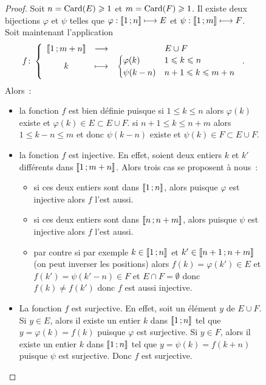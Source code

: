 \begin{figure}
\begin{proof}
  Soit \(n=\operatorname{Card}(E)\geqslant 1\) et \(m=\operatorname{Card}(F)\geqslant 1\). Il existe deux bijections \(\varphi\) et \(\psi\) telles que \(\varphi:\mathopen{\llbracket}1\mathclose{}\mathpunct{};n\mathclose{\rrbracket} \longmapsto E\) et \(\psi:\mathopen{\llbracket}1\mathclose{}\mathpunct{};m\mathclose{\rrbracket} \longmapsto F\). Soit maintenant l'application
  \begin{equation}
    f\colon \left\{\begin{array}{ccc} \mathopen{\llbracket}1\mathclose{}\mathpunct{};m+n\mathclose{\rrbracket} & \longrightarrow &E\cup F\\ k & \longmapsto & \begin{cases} \varphi(k) & 1\leqslant k\leqslant n \\ \psi(k-n) & n+1\leqslant k\leqslant m+n\end{cases} \end{array} \right..
  \end{equation}
  Alors~:
    \begin{itemize}
    \item la fonction \(f\) est bien définie puisque si \(1\leqslant k \leqslant n\) alors \(\varphi(k)\) existe et \(\varphi(k)\in E\subset E\cup F\). si \(n+1\leqslant k \leqslant n+m\) alors \(1\leqslant k-n \leqslant m\) et donc \(\psi(k-n)\) existe et \(\psi(k)\in F\subset E\cup F\).
    \item la fonction \(f\) est injective. En effet, soient deux entiers \(k\) et \(k'\) différents  dans \(\mathopen{\llbracket}1\mathclose{}\mathpunct{};m+n\mathclose{\rrbracket}\). Alors trois cas se proposent à nous~:
      \begin{itemize}
      \item si ces deux entiers sont dans \(\mathopen{\llbracket}1\mathclose{}\mathpunct{};n\mathclose{\rrbracket}\), alors puisque \(\varphi\) est injective alors \(f\) l'est aussi.
      \item si ces deux entiers sont dans \(\mathopen{\llbracket}n\mathclose{}\mathpunct{};n+m\mathclose{\rrbracket}\), alors puisque \(\psi\) est injective alors \(f\) l'est aussi.
      \item par contre si par exemple \(k\in\mathopen{\llbracket}1\mathclose{}\mathpunct{};n\mathclose{\rrbracket}\) et \(k'\in\mathopen{\llbracket}n+1\mathclose{}\mathpunct{};n+m\mathclose{\rrbracket}\) (on peut inverser les positions) alors \(f(k)=\varphi(k')\in E\) et \(f(k')=\psi(k'-n)\in F\) et \(E\cap F = \emptyset\) donc \(f(k)\neq f(k')\) donc \(f\) est aussi injective.
      \end{itemize}
    \item La fonction \(f\) est surjective. En effet, soit un élément \(y\) de \(E\cup F\). Si \(y\in E\), alors il existe un entier \(k\) dans \(\mathopen{\llbracket}1\mathclose{}\mathpunct{};n\mathclose{\rrbracket}\) tel que \(y=\varphi(k)=f(k)\) puisque \(\varphi\) est surjective. Si \(y\in F\), alors il existe un entier \(k\) dans \(\mathopen{\llbracket}1\mathclose{}\mathpunct{};n\mathclose{\rrbracket}\) tel que \(y=\psi(k)=f(k+n)\) puisque \(\psi\) est surjective. Donc \(f\) est surjective.
    \end{itemize}

\end{proof}
\end{figure}
